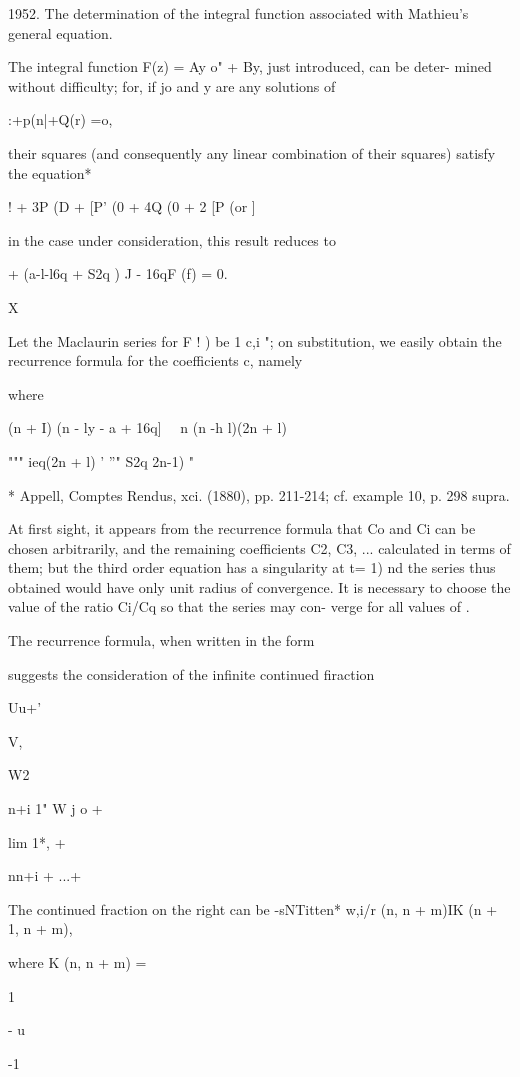 1952. The determination of the integral function associated with
Mathieu's general equation.

The integral function F(z) = Ay o" + By, just introduced, can be
deter- mined without difficulty; for, if jo and y are any solutions
of

 :+p(n|+Q(r) =o,

their squares (and consequently any linear combination of their
squares) satisfy the equation*

 ! + 3P (D + [P' (0 + 4Q (0 + 2 [P (or ]

in the case under consideration, this result reduces to

+ (a-l-l6q + S2q ) J - 16qF (f) = 0.

X

Let the Maclaurin series for F ! ) be 1 c,i "; on substitution, we
easily obtain the recurrence formula for the coefficients c, namely

where

(n + I) (n - ly - a + 16q] \ \ n (n -h l)(2n + l)

""" ieq(2n + l) ' ''" S2q 2n-1) "

* Appell, Comptes Rendus, xci. (1880), pp. 211-214; cf. example 10,
p. 298 supra.

%
%

At first sight, it appears from the recurrence formula that Co and Ci
can be chosen arbitrarily, and the remaining coefficients C2, C3, ...
calculated in terms of them; but the third order equation has a
singularity at t= 1) nd the series thus obtained would have only unit
radius of convergence. It is necessary to choose the value of the
ratio Ci/Cq so that the series may con- verge for all values of .

The recurrence formula, when written in the form

suggests the consideration of the infinite continued firaction

Uu+'

V,

W2

n+i 1" W j o +  

lim 1*, +

nn+i + ...+

The continued fraction on the right can be -sNTitten* w,i/r (n, n +
m)IK (n + 1, n + m),

where K (n, n + m) =

1

- u

-1

